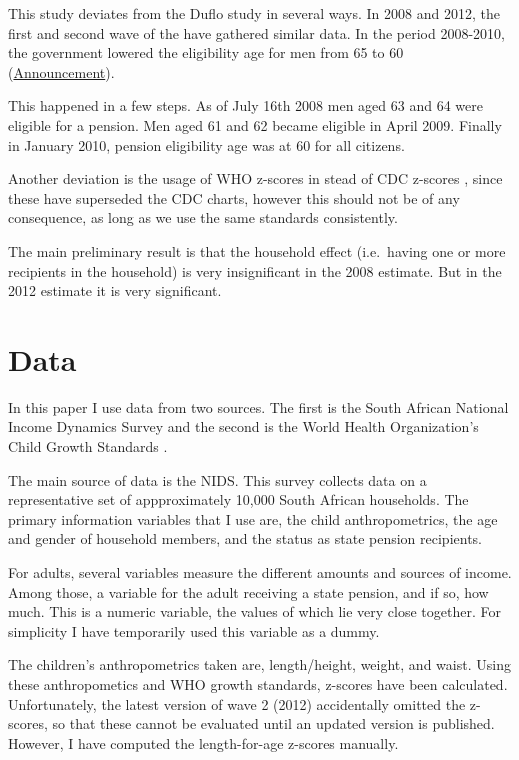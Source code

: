 \documentclass[a4paper]{report}\usepackage{graphicx, color}
\begin{document}
\begin{refsection}
This study deviates from the Duflo study in several ways. In 2008 and 2012, the first and second wave of the \textcite{saldru2008nids, saldru2012nids} have gathered similar data. In the period 2008-2010, the government lowered the eligibility age for men from 65 to 60 (\href{http://www.southafrica.info/services/government/pension-160708.htm}{Announcement}).

This happened in a few steps. As of July 16th 2008 men aged 63 and 64 were eligible for a pension. Men aged 61 and 62 became eligible in April 2009. Finally in January 2010, pension eligibility age was at 60 for all citizens.

Another deviation is the usage of WHO z-scores \parencite{who2006child} in stead of CDC z-scores \parencite{nchs2000cdc}, since these have superseded the CDC charts, however this should not be of any consequence, as long as we use the same standards consistently.

The main preliminary result is that the household effect (i.e.~having one or more recipients in the household) is very insignificant in the 2008 estimate. But in the 2012 estimate it is very significant.

\section{Data}

In this paper I use data from two sources. The first is the South African National Income Dynamics Survey \parencite{saldru2008nids, saldru2012nids} and the second is the World Health Organization's Child Growth Standards \parencite{who2006child}.

The main source of data is the NIDS. This survey collects data on a representative set of appproximately 10,000 South African households. The primary information variables that I use are, the child anthropometrics, the age and gender of household members, and the status as state pension recipients.

For adults, several variables measure the different amounts and sources of income. Among those, a variable for the adult receiving a state pension, and if so, how much. This is a numeric variable, the values of which lie very close together. For simplicity I have temporarily used this variable as a dummy.

The children's anthropometrics taken are, length/height, weight, and waist. Using these anthropometics and WHO growth standards, z-scores have been calculated. Unfortunately, the latest version of wave 2 (2012) accidentally omitted the z-scores, so that these cannot be evaluated until an updated version is published. However, I have computed the length-for-age z-scores manually.


\end{refsection}
\end{document}
